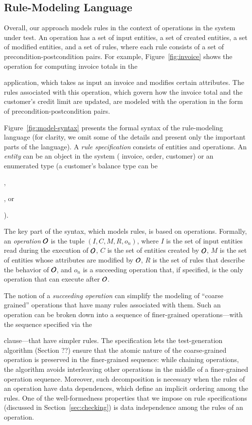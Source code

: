 \subsection{Rule-Modeling Language}

Overall, our approach models rules in the context of operations in the system
under test.  An operation has a set of input entities, a set of created
entities, a set of modified entities, and a set of rules, where each rule
consists of a set of precondition-postcondition pairs. For example,
Figure~\ref{fig:invoice} shows the operation for computing invoice totals in the
\subject{JBilling} application, which takes as input an invoice and modifies
certain attributes. The rules associated with this operation, which govern how
the invoice total and the customer's credit limit are updated, are modeled with
the operation in the form of precondition-postcondition pairs.

Figure~\ref{fig:model-syntax} presents the formal syntax of the rule-modeling
language (for clarity, we omit some of the details and present only the
important parts of the language). A \textit{rule specification} consists of
entities and operations. An \textit{entity} can be an object in the system (\eg
invoice, order, customer) or an enumerated type (\eg a customer's balance type
can be \subject{None}, \subject{Credit}, or \subject{Prepaid}).

The key part of the syntax, which models rules, is based on
operations. Formally, an \textit{operation} ${\cal O}$ is the tuple $(I, C, M,
R, o_n)$, where $I$ is the set of input entities read during the execution of
${\cal O}$, $C$ is the set of entities created by ${\cal O}$, $M$ is the set of
entities whose attributes are modified by ${\cal O}$, $R$ is the set of rules
that describe the behavior of ${\cal O}$, and $o_n$ is a succeeding operation
that, if specified, is the only operation that can execute after ${\cal O}$.

The notion of a \textit{succeeding operation} can simplify the modeling of
``coarse grained'' operations that have many rules associated with them. Such an
operation can be broken down into a sequence of finer-grained operations---with
the sequence specified via the \subject{next} clause---that have simpler
rules. The specification lets the test-generation algorithm (Section ??) ensure
that the atomic nature of the coarse-grained operation is preserved in the
finer-grained sequence: while chaining operations, the algorithm avoids
interleaving other operations in the middle of a finer-grained operation
sequence.  Moreover, such decomposition is necessary when the rules of an
operation have data dependences, which define an implicit ordering among the
rules. One of the well-formedness properties that we impose on rule
specifications (discussed in Section~\ref{sec:checking}) is data independence
among the rules of an operation.

